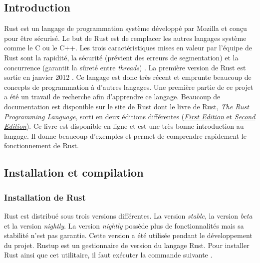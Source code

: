 
\subsection{Introduction}
Rust est un langage de programmation système développé par Mozilla et conçu pour
être sécurisé. Le but de Rust est de remplacer les autres langages système comme
le C ou le C++. Les trois caractéristiques mises en valeur par l'équipe de Rust
sont la rapidité, la sécurité (prévient des erreurs de segmentation) et la concurrence
(garantit la sûreté entre \textit{threads}) \cite{ref27}. La première version
de Rust est sortie en janvier 2012 \cite{ref28}. Ce langage est donc très récent
et emprunte beaucoup de concepts de programmation à d'autres langages. Une première
partie de ce projet a été un travail de recherche afin d'apprendre ce langage.
Beaucoup de documentation est disponible sur le site de Rust dont le livre
de Rust, \textit{The Rust Programming Language}, sorti en deux éditions différentes
(\href{https://doc.rust-lang.org/book/first-edition}{\textit{First Edition}} et
\href{https://doc.rust-lang.org/book/second-edition}{\textit{Second Edition}}).
Ce livre est disponible en ligne et est une très bonne introduction au langage.
Il donne beaucoup d'exemples et permet de comprendre rapidement le fonctionnement de
Rust.


\subsection{Installation et compilation}
\subsubsection{Installation de Rust}
Rust est distribué sous trois versions différentes. La version \textit{stable},
la version \textit{beta} et la version \textit{nightly}. La version \textit{nightly}
possède plus de fonctionnalités mais sa stabilité n'est pas garantie. Cette version
a été utilisée pendant le développement du projet. Rustup est un gestionnaire de
version du langage Rust. Pour installer Rust ainsi que cet utilitaire, il faut
exécuter la commande suivante \cite{ref2}.

